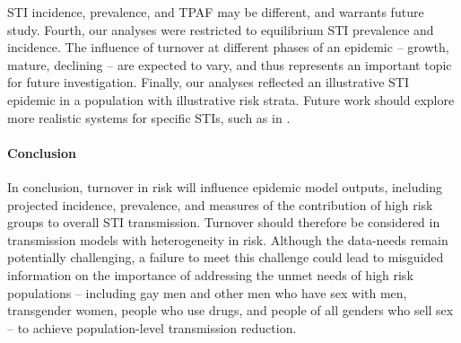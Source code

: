 STI incidence, prevalence, and TPAF may be different, and warrants future study.
Fourth, our analyses were restricted to
equilibrium STI prevalence and incidence.
The influence of turnover at different phases of an epidemic
-- growth, mature, declining --
are expected to vary, and thus represents an important topic for future investigation.
Finally, our analyses reflected an illustrative STI epidemic
in a population with illustrative risk strata.
Future work should explore more realistic systems for specific STIs,
such as in \citep{Johnson2016}.
\paragraph{Conclusion}
In conclusion, turnover in risk will influence
epidemic model outputs, including projected incidence, prevalence, and
measures of the contribution of high risk groups to overall STI transmission.
Turnover should therefore be considered in
transmission models with heterogeneity in risk.
Although the data-needs remain potentially challenging,
a failure to meet this challenge
could lead to misguided information on the importance of
addressing the unmet needs of high risk populations -- including
gay men and other men who have sex with men,
transgender women,
people who use drugs, and
people of all genders who sell sex
-- to achieve population-level transmission reduction.
